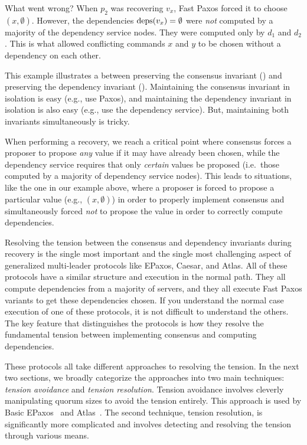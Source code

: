 What went wrong? When $p_2$ was recovering $v_x$, Fast Paxos forced it to
choose $(x, \emptyset{})$. However, the dependencies $\text{deps}(v_x) = \emptyset{}$
were \emph{not} computed by a majority of the dependency service nodes. They
were computed only by $d_1$ and $d_2$. This is what allowed conflicting
commands $x$ and $y$ to be chosen without a dependency on each other.

This example illustrates a  between preserving
the consensus invariant () and preserving the
dependency invariant (). Maintaining the consensus
invariant in isolation is easy (e.g., use Paxos), and maintaining the
dependency invariant in isolation is also easy (e.g., use the dependency
service). But, maintaining both invariants simultaneously is tricky.

When performing a recovery, we reach a critical point where consensus forces a
proposer to propose \emph{any} value if it may have already been chosen, while
the dependency service requires that only \emph{certain} values be proposed
(i.e.\ those computed by a majority of dependency service nodes).
%
This leads to situations, like the one in our example above, where a proposer
is forced to propose a particular value (e.g., $(x, \emptyset{})$) in order to
properly implement consensus and simultaneously forced \emph{not} to propose
the value in order to correctly compute dependencies.

Resolving the tension between the consensus and dependency invariants during
recovery is the single most important and the single most challenging aspect of
generalized multi-leader protocols like EPaxos, Caesar, and Atlas. All of these
protocols have a similar structure and execution in the normal path. They all
compute dependencies from a majority of servers, and they all execute Fast
Paxos variants to get these dependencies chosen. If you understand the normal
case execution of one of these protocols, it is not difficult to understand the
others. The key feature that distinguishes the protocols is how they resolve
the fundamental tension between implementing consensus and computing
dependencies.

These protocols all take different approaches to resolving the tension. In the
next two sections, we broadly categorize the approaches into two main
techniques: \emph{tension avoidance} and \emph{tension resolution}.  Tension
avoidance involves cleverly manipulating quorum sizes to avoid the tension
entirely. This approach is used by Basic EPaxos~\cite{moraru2013proof} and
Atlas~\cite{enes2020state}. The second technique, tension resolution, is
significantly more complicated and involves detecting and resolving the tension
through various means.
